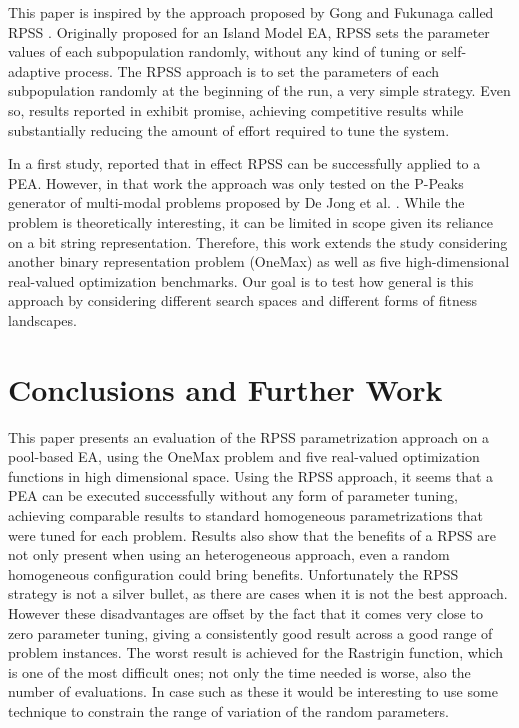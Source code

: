 This paper is inspired by the approach proposed by Gong and Fukunaga
called RPSS \cite{fuku1,fuku2}. 
Originally proposed for an Island Model EA, RPSS sets the parameter values of each subpopulation randomly, 
without any kind of tuning or self-adaptive process. The RPSS approach is to set the parameters 
of each subpopulation randomly at the beginning of the run, a very simple strategy.
Even so, results reported in \cite{fuku1,fuku2} exhibit promise, achieving competitive results 
while substantially reducing the amount of effort required to tune the system.

In a first study, \cite{garcia2014randomized} reported that in effect RPSS 
can be successfully applied to a PEA. However, in that work the
approach was only tested on the P-Peaks generator of multi-modal problems proposed by De Jong et al. \cite{Jong:PS97}.
While the problem is theoretically interesting, it can be limited in scope given its reliance on a bit string representation.
Therefore, this work extends the study considering another binary representation problem (OneMax) as well as 
five high-dimensional real-valued optimization benchmarks. Our goal is
to test how general is this approach by considering different search
spaces and different forms of fitness landscapes. 

\section{Conclusions and Further Work}
\label{sec:conclusions}
This paper presents an evaluation of the RPSS parametrization approach on 
a pool-based EA, using the OneMax problem and five real-valued optimization functions
in high dimensional space. 
Using the RPSS approach, it seems that a PEA can be executed successfully 
without any form of parameter tuning, achieving comparable results to standard homogeneous
parametrizations that were tuned for each problem. 
Results also show that the benefits of a RPSS are not only present
when using an heterogeneous approach, even a random homogeneous configuration could bring
benefits. Unfortunately the RPSS strategy is not a silver bullet, as there are cases
when it is not the best approach. However these disadvantages are
offset by the fact that it comes very close to zero parameter tuning,
giving a consistently good result across a good range of problem instances.
The worst result is achieved for the Rastrigin function, which
is one of the most difficult ones; not only the time needed is worse,
also the number of evaluations. In case such as these it would be
interesting to use some technique to constrain the range of variation
of the random parameters.

